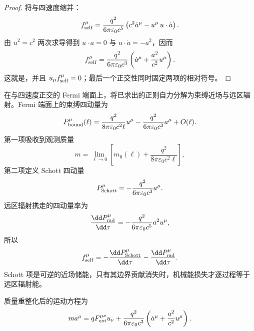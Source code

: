 \begin{proof}
将与四速度缩并：
\[
 f_{\rm self}^\mu
 =\frac{q^2}{6\pi\varepsilon_0c^5}
 \left(c^2\dot a^\mu-u^\mu\,u\cdot\dot a\right).
\]
由 \(u^2=c^2\) 两次求导得到
\(u\cdot a=0\) 与 \(u\cdot\dot a=-a^2\)，因而
\[
 f_{\rm self}^\mu
 =\frac{q^2}{6\pi\varepsilon_0c^3}
 \left(\dot a^\mu+\frac{a^2}{c^2}u^\mu\right).
\]
这就是，并且
\(u_\mu f_{\rm self}^\mu=0\)；最后一个正交性同时固定两项的相对符号。
\end{proof}
\begin{proposition}[质量重整化后的动量平衡]
在与四速度正交的 Fermi 端面上，将已求出的正则自力分解为束缚近场与远区辐射。Fermi 端面上的束缚四动量为
\begin{equation}
 P_{\rm bound}^\mu(\ell)
 =\frac{q^2}{8\pi\varepsilon_0c^2\ell}u^\mu
 -\frac{q^2}{6\pi\varepsilon_0c^3}a^\mu+O(\ell).
 \label{eq:phys-rr-bound-momentum-expansion}
\end{equation}
第一项吸收到观测质量
\begin{equation}
 m=\lim_{\ell\to0}\left[
 m_0(\ell)+\frac{q^2}{8\pi\varepsilon_0c^2\ell}\right],
 \label{eq:phys-rr-mass-renormalization}
\end{equation}
第二项定义 Schott 四动量
\begin{equation}
 P_{\rm Schott}^\mu
 =-\frac{q^2}{6\pi\varepsilon_0c^3}a^\mu .
 \label{eq:phys-rr-schott-momentum}
\end{equation}
远区辐射携走的四动量率为
\begin{equation}
 \frac{\dd P_{\rm rad}^\mu}{\dd\tau}
 =-\frac{q^2}{6\pi\varepsilon_0c^5}a^2u^\mu ,
 \label{eq:phys-rr-radiated-four-momentum-rate}
\end{equation}
所以
\begin{equation}
 f_{\rm self}^\mu
 =-\frac{\dd P_{\rm Schott}^\mu}{\dd\tau}
 -\frac{\dd P_{\rm rad}^\mu}{\dd\tau}.
 \label{eq:phys-rr-self-force-momentum-split}
\end{equation}
Schott 项是可逆的近场储能，只有其边界贡献消失时，机械能损失才逐过程等于远区辐射能。

质量重整化后的运动方程为
\begin{equation}
 ma^\mu=qF_{\rm ext}^{\mu\nu}u_\nu+
 \frac{q^2}{6\pi\varepsilon_0c^3}
 \left(\dot a^\mu+\frac{a^2}{c^2}u^\mu\right).
 \label{eq:phys-rr-ald}
\end{equation}
\end{proposition}

